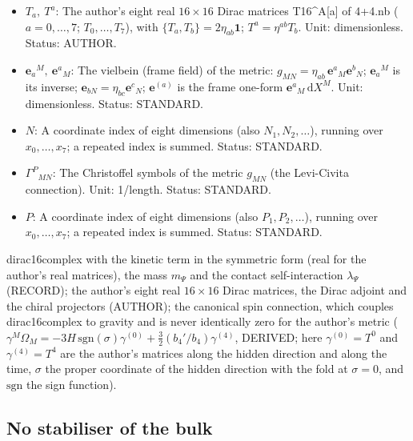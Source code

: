 \documentclass[
  10pt,
]{article}
\begin{document}
\begin{itemize}
  \(\Sigma^{ab},\ \Sigma^{\mu\nu}\): The generators of Spin(4,4) on
  dirac16complex, \(\Sigma^{ab} = \frac14[T^a, T^b]\) (the scaled
  commutators of the author's matrices);
  \(\Sigma^{\mu\nu} = \mathbf{e}_a{}^\mu\mathbf{e}_b{}^\nu\Sigma^{ab}\)
  along the fold. Unit: dimensionless. Status: AUTHOR.
\item
  \(T_a,\ T^a\): The author's eight real \(16 \times 16\) Dirac matrices
  T16\^{}A{[}a{]} of 4+4.nb (\(a = 0, \dots, 7\); \(T_0, \dots, T_7\)),
  with \(\{T_a, T_b\} = 2\eta_{ab}\mathbf{1}\); \(T^a = \eta^{ab}T_b\).
  Unit: dimensionless. Status: AUTHOR.
\item
  \(\mathbf{e}_a{}^M,\ \mathbf{e}^a{}_M\): The vielbein (frame field) of
  the metric: \(g_{MN} = \eta_{ab}\,\mathbf{e}^a{}_M\mathbf{e}^b{}_N\);
  \(\mathbf{e}_a{}^M\) is its inverse;
  \(\mathbf{e}_{bN} = \eta_{bc}\mathbf{e}^c{}_N\); \(\mathbf{e}^{(a)}\)
  is the frame one-form \(\mathbf{e}^a{}_M\,\mathrm{d}X^M\). Unit:
  dimensionless. Status: STANDARD.
\item
  \(N\): A coordinate index of eight dimensions (also
  \(N_1, N_2, \dots\)), running over \(x_0, \dots, x_7\); a repeated
  index is summed. Status: STANDARD.
\item
  \(\Gamma^P{}_{MN}\): The Christoffel symbols of the metric \(g_{MN}\)
  (the Levi-Civita connection). Unit: 1/length. Status: STANDARD.
\item
  \(P\): A coordinate index of eight dimensions (also
  \(P_1, P_2, \dots\)), running over \(x_0, \dots, x_7\); a repeated
  index is summed. Status: STANDARD.
\end{itemize}

dirac16complex with the kinetic term in the symmetric form (real for the
author's real matrices), the mass \(m_\Psi\) and the contact
self-interaction \(\lambda_\Psi\) (RECORD); the author's eight real
\(16 \times 16\) Dirac matrices, the Dirac adjoint and the chiral
projectors (AUTHOR); the canonical spin connection, which couples
dirac16complex to gravity and is never identically zero for the author's
metric
(\(\gamma^M\Omega_M = -3H\,\mathrm{sgn}(\sigma)\gamma^{(0)} + \frac32(b_4'/b_4)\gamma^{(4)}\),
DERIVED; here \(\gamma^{(0)} = T^0\) and \(\gamma^{(4)} = T^4\) are the
author's matrices along the hidden direction and along the time,
\(\sigma\) the proper coordinate of the hidden direction with the fold
at \(\sigma = 0\), and \(\mathrm{sgn}\) the sign function).

\hypertarget{no-stabiliser-of-the-bulk}{%
\subsection{No stabiliser of the bulk}\label{no-stabiliser-of-the-bulk}}
\end{document}
